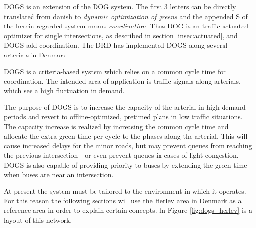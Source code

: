 \label{sec:dogs}

DOGS is an extension of the DOG system. The first 3 letters can be
directly translated from danish to \textit{dynamic optimization of
greens} and the appended S of the herein regarded system means
\textit{coordination}. Thus DOG is an traffic actuated optimizer for
single intersections, as described in section \ref{insec:actuated},
and DOGS add coordination. The DRD has implemented DOGS along several
arterials in Denmark.

DOGS is a criteria-based system which relies on a common cycle time
for coordination. The intended area of application is traffic signals
along arterials, which see a high fluctuation in demand.

The purpose of DOGS is to increase the capacity of the arterial in
high demand periods and revert to offline-optimized, pretimed plans in
low traffic situations. The capacity increase is realized by
increasing the common cycle time and allocate the extra green time per
cycle to the phases along the arterial. This will cause increased
delays for the minor roads, but may prevent queues from reaching the
previous intersection - or even prevent queues in cases of light
congestion.  DOGS is also capable of providing priority to buses by
extending the green time when buses are near an intersection.

At present the system must be tailored to the environment in which it
operates. For this reason the following sections will use the Herlev
area in Denmark as a reference area in order to explain certain
concepts. In Figure \ref{fig:dogs_herlev} is a layout of this network.

